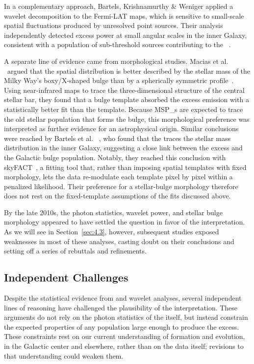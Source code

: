 In a complementary approach, Bartels, Krishnamurthy \& Weniger applied a wavelet decomposition to the Fermi-LAT maps, which is sensitive to small-scale spatial fluctuations produced by unresolved point sources.
Their analysis independently detected excess power at small angular scales in the inner Galaxy, consistent with a population of sub-threshold sources contributing to the \GCE~\cite{Bartels:2015aea}.

A separate line of evidence came from morphological studies.
Macias et al.
\ argued that the \GCE spatial distribution is better described by the stellar mass of the Milky Way's boxy/X-shaped bulge than by a spherically symmetric \NFW profile~\cite{Macias:2016nev,Macias:2019omb}.
Using near-infrared maps to trace the three-dimensional structure of the central stellar bar, they found that a bulge template absorbed the excess emission with a statistically better fit than the \NFW template.
Because \glspl{MSP_} are expected to trace the old stellar population that forms the bulge, this morphological preference was interpreted as further evidence for an astrophysical origin.
Similar conclusions were reached by Bartels et al.
\ \cite{Bartels:2017vsx}, who found that the \GCE traces the stellar mass distribution in the inner Galaxy, suggesting a close link between the excess and the Galactic bulge population.
Notably, they reached this conclusion with skyFACT~\cite{Storm:2017arh}, a fitting tool that, rather than imposing spatial templates with fixed morphology, lets the data re-modulate each template pixel by pixel within a penalized likelihood.
Their preference for a stellar-bulge morphology therefore does not rest on the fixed-template assumptions of the fits discussed above.

By the late 2010s, the \NPTF photon statistics, wavelet power, and stellar bulge morphology appeared to have settled the question in favor of the \MSP interpretation.
As we will see in Section~\ref{sec:4.3}, however, subsequent studies exposed weaknesses in most of these analyses, casting doubt on their conclusions and setting off a series of rebuttals and refinements.

\subsection{Independent Challenges}
\label{sec:4.2.2}

Despite the statistical evidence from \NPTF and wavelet analyses, several independent lines of reasoning have challenged the plausibility of the \MSP interpretation.
These arguments do not rely on the photon statistics of the \GCE itself, but instead constrain the expected properties of any \MSP population large enough to produce the excess.
These constraints rest on our current understanding of \MSP formation and evolution, in the Galactic center and elsewhere, rather than on the \GCE data itself; revisions to that understanding could weaken them.

